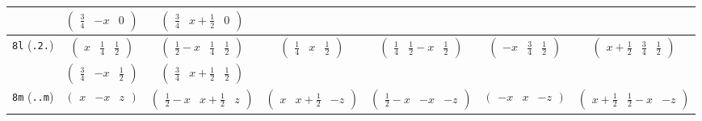 \documentclass[fleqn,9pt,landscape]{jsarticle}
\begin{document}
\begin{center}
\begin{longtable}{ccccccc}
& $ \begin{pmatrix} \frac{3}{4} & - x & 0 \end{pmatrix} $ & $ \begin{pmatrix} \frac{3}{4} & x + \frac{1}{2} & 0 \end{pmatrix} $ & $  $ & $  $ & $  $ & $  $ \\ \hline
{\tt 8l} ({\tt .2.}) & $ \begin{pmatrix} x & \frac{1}{4} & \frac{1}{2} \end{pmatrix} $ & $ \begin{pmatrix} \frac{1}{2} - x & \frac{1}{4} & \frac{1}{2} \end{pmatrix} $ & $ \begin{pmatrix} \frac{1}{4} & x & \frac{1}{2} \end{pmatrix} $ & $ \begin{pmatrix} \frac{1}{4} & \frac{1}{2} - x & \frac{1}{2} \end{pmatrix} $ & $ \begin{pmatrix} - x & \frac{3}{4} & \frac{1}{2} \end{pmatrix} $ & $ \begin{pmatrix} x + \frac{1}{2} & \frac{3}{4} & \frac{1}{2} \end{pmatrix} $ \\
& $ \begin{pmatrix} \frac{3}{4} & - x & \frac{1}{2} \end{pmatrix} $ & $ \begin{pmatrix} \frac{3}{4} & x + \frac{1}{2} & \frac{1}{2} \end{pmatrix} $ & $  $ & $  $ & $  $ & $  $ \\ \hline
{\tt 8m} ({\tt ..m}) & $ \begin{pmatrix} x & - x & z \end{pmatrix} $ & $ \begin{pmatrix} \frac{1}{2} - x & x + \frac{1}{2} & z \end{pmatrix} $ & $ \begin{pmatrix} x & x + \frac{1}{2} & - z \end{pmatrix} $ & $ \begin{pmatrix} \frac{1}{2} - x & - x & - z \end{pmatrix} $ & $ \begin{pmatrix} - x & x & - z \end{pmatrix} $ & $ \begin{pmatrix} x + \frac{1}{2} & \frac{1}{2} - x & - z \end{pmatrix} $ \\

\end{longtable}
\end{center}
\end{document}

